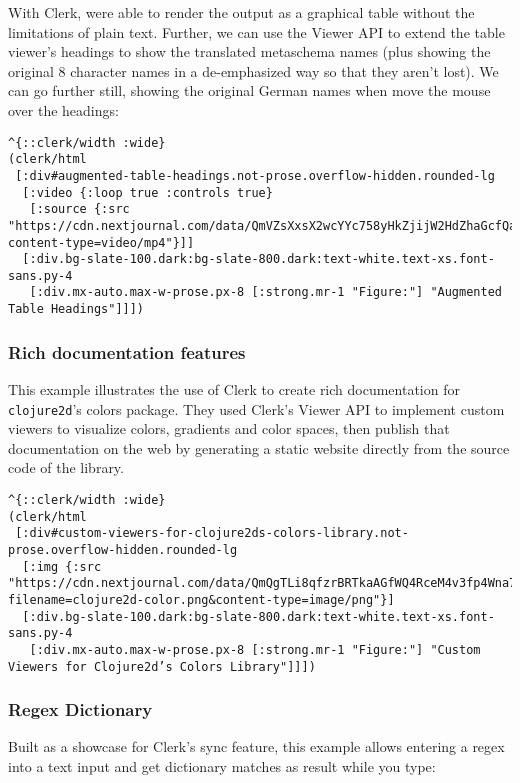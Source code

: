 \documentclass[
]{article}
\newcommand{\passthrough}[1]{#1}
\begin{document}
With Clerk, were able to render the output as a graphical table without the limitations of plain text. Further, we can use the Viewer API to extend the table viewer's headings to show the translated metaschema names (plus showing the original 8 character names in a de-emphasized way so that they aren't lost). We can go further still, showing the original German names when move the mouse over the headings:

\begin{lstlisting}
^{::clerk/width :wide}
(clerk/html
 [:div#augmented-table-headings.not-prose.overflow-hidden.rounded-lg
  [:video {:loop true :controls true}
   [:source {:src "https://cdn.nextjournal.com/data/QmVZsXxsX2wcYYc758yHkZjijW2HdZhaGcfQaHpAkZeqWk?content-type=video/mp4"}]]
  [:div.bg-slate-100.dark:bg-slate-800.dark:text-white.text-xs.font-sans.py-4
   [:div.mx-auto.max-w-prose.px-8 [:strong.mr-1 "Figure:"] "Augmented Table Headings"]]])
\end{lstlisting}

\hypertarget{id}{%
\subsubsection{Rich documentation features}\label{id}}

This example illustrates the use of Clerk to create rich documentation for \passthrough{\lstinline!clojure2d!}'s colors package. They used Clerk's Viewer API to implement custom viewers to visualize colors, gradients and color spaces, then publish that documentation on the web by generating a static website directly from the source code of the library.

\begin{lstlisting}
^{::clerk/width :wide}
(clerk/html
 [:div#custom-viewers-for-clojure2ds-colors-library.not-prose.overflow-hidden.rounded-lg
  [:img {:src "https://cdn.nextjournal.com/data/QmQgTLi8qfzrBRTkaAGfWQ4RceM4v3fp4Wna7knivMgusb?filename=clojure2d-color.png&content-type=image/png"}]
  [:div.bg-slate-100.dark:bg-slate-800.dark:text-white.text-xs.font-sans.py-4
   [:div.mx-auto.max-w-prose.px-8 [:strong.mr-1 "Figure:"] "Custom Viewers for Clojure2d’s Colors Library"]]])
\end{lstlisting}

\hypertarget{id}{%
\subsubsection{Regex Dictionary}\label{id}}

Built as a showcase for Clerk's sync feature, this example allows entering a regex into a text input and get dictionary matches as result while you type:
\end{document}
